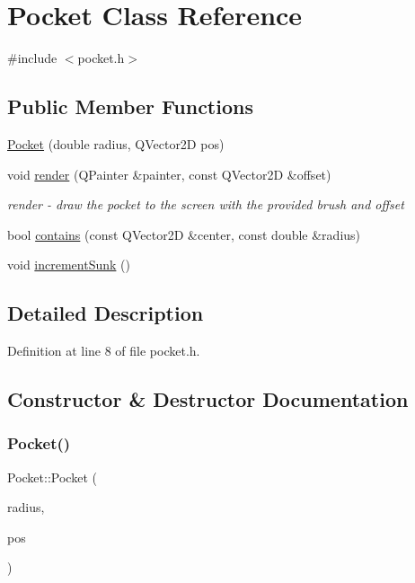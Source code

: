 \hypertarget{class_pocket}{}\section{Pocket Class Reference}
\label{class_pocket}


{\ttfamily \#include $<$pocket.\+h$>$}

\subsection*{Public Member Functions}
\begin{DoxyCompactItemize}
\item 
\mbox{\hyperlink{class_pocket_a967b7b80a4a7aba6b56509d1d0e28a24}{Pocket}} (double radius, Q\+Vector2D pos)
\item 
void \mbox{\hyperlink{class_pocket_ab6114f9e08389b3ccdba3676275479e7}{render}} (Q\+Painter \&painter, const Q\+Vector2D \&offset)
\begin{DoxyCompactList}\small\item\em render -\/ draw the pocket to the screen with the provided brush and offset \end{DoxyCompactList}\item 
bool \mbox{\hyperlink{class_pocket_ac01b76c9853e24904296d467ceeaa821}{contains}} (const Q\+Vector2D \&center, const double \&radius)
\item 
void \mbox{\hyperlink{class_pocket_a4ba8a5305df04f95a25a6c7027b05c2b}{increment\+Sunk}} ()
\end{DoxyCompactItemize}


\subsection{Detailed Description}


Definition at line 8 of file pocket.\+h.



\subsection{Constructor \& Destructor Documentation}
\mbox{\label{class_pocket_a967b7b80a4a7aba6b56509d1d0e28a24}} 
\subsubsection{\texorpdfstring{Pocket()}{Pocket()}}
{\footnotesize\ttfamily Pocket\+::\+Pocket (\begin{DoxyParamCaption}\item[{double}]{radius,  }\item[{Q\+Vector2D}]{pos }\end{DoxyParamCaption})\hspace{0.3cm}{\ttfamily [inline]}}




